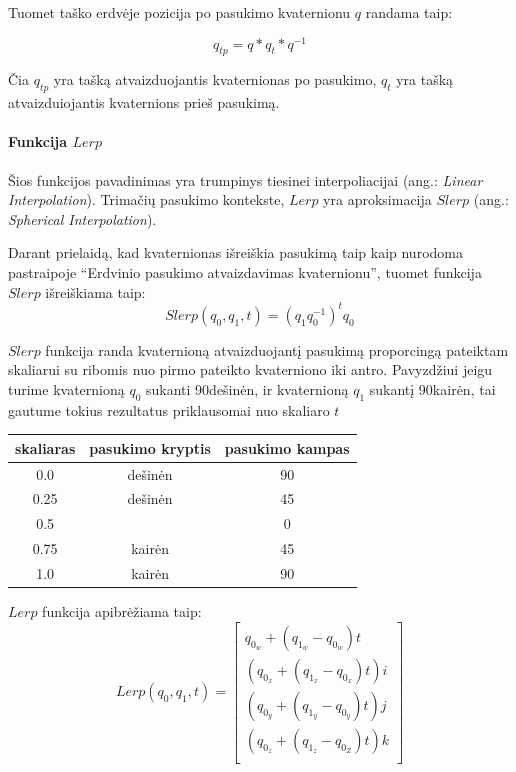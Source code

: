 \documentclass[12pt, a4paper, lithuanian, final]{article}
\begin{document}
Tuomet taško erdvėje pozicija po pasukimo kvaternionu $q$ randama taip:

\begin{equation}
	q_{tp} = q * q_{t} * q^{-1}
\end{equation}

Čia $q_{tp}$ yra tašką atvaizduojantis kvaternionas po pasukimo, $q_{t}$ yra tašką atvaizduiojantis kvaternions prieš pasukimą.



\paragraph{Funkcija $Lerp$}

Šios funkcijos pavadinimas yra trumpinys tiesinei interpoliacijai (ang.: \textit{Linear Interpolation}).
Trimačių pasukimo kontekste, $Lerp$ yra aproksimacija $Slerp$ (ang.: \textit{Spherical Interpolation}).

Darant prielaidą, kad kvaternionas išreiškia pasukimą taip kaip nurodoma pastraipoje "`Erdvinio pasukimo atvaizdavimas kvaternionu"', tuomet funkcija $Slerp$ išreiškiama taip:
\begin{equation}
	Slerp(q_0, q_1, t) = (q_1 q_0^{-1})^{t}q_0
\end{equation}

$Slerp$ funkcija randa kvaternioną atvaizduojantį pasukimą proporcingą pateiktam skaliarui su ribomis nuo pirmo pateikto kvaterniono iki antro.
Pavyzdžiui jeigu turime kvaternioną $q_0$ sukanti 90\degree dešinėn, ir kvaternioną $q_1$ sukantį 90\degree kairėn, tai gautume tokius rezultatus priklausomai nuo skaliaro $t$

\begin{center}
\begin{tabular}{ | c | c | c | }
	\hline
	\textbf{skaliaras} & \textbf{pasukimo kryptis} & \textbf{pasukimo kampas} \\
	\hline
	0.0 & dešinėn & 90\degree \\
	\hline
	0.25 & dešinėn & 45\degree \\
	\hline
	0.5 & & 0\degree \\
	\hline
	0.75 & kairėn & 45\degree \\
	\hline
	1.0 & kairėn & 90\degree \\
	\hline
\end{tabular}
\end{center}

$Lerp$ funkcija apibrėžiama taip:
\begin{equation}
	Lerp(q_0, q_1, t) = \left[
		\begin{array}{c}
			q_{0_w} + (q_{1_w} - q_{0_w})t \\
			(q_{0_x} + (q_{1_x} - q_{0_x})t) i \\
			(q_{0_y} + (q_{1_y} - q_{0_y})t) j \\
			(q_{0_z}+ (q_{1_z} - q_{0_Z})t) k \\
		\end{array}
	\right]
\end{equation}
\end{document}

